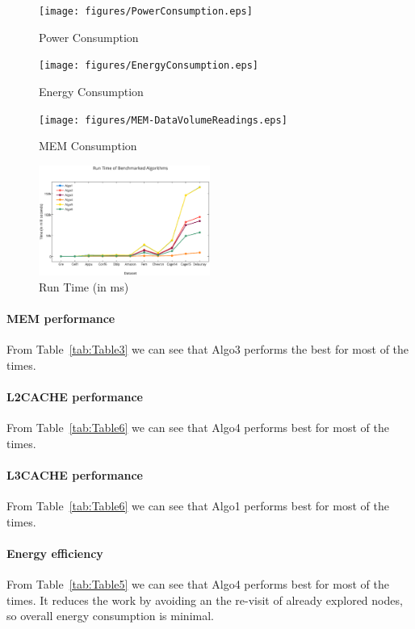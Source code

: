 \begin{figure}[t]
    \centering
    \texttt{[image: figures/PowerConsumption.eps]}
    \caption{Power Consumption}
    \label{fig:Power Consumption}
\end{figure}


\begin{figure}[t]
    \centering
    \texttt{[image: figures/EnergyConsumption.eps]}
    \caption{Energy Consumption}
    \label{fig:Energy Consumption}
\end{figure}


\begin{figure}[t]
    \centering
    \texttt{[image: figures/MEM-DataVolumeReadings.eps]}
    \caption{MEM Consumption}
    \label{fig:MEM Consumption}
\end{figure}

\begin{figure}[t]
    \centering
    \includegraphics[width=0.5\textwidth]{figures/RunTimeofBenchmarkedAlgorithms.eps}
    \caption{Run Time (in ms)}
    \label{fig:Run Time}
\end{figure}

\paragraph{MEM performance}
From Table~\ref{tab:Table3} we can see that Algo3 performs the best
for most of the times.

\paragraph{L2CACHE performance}
From Table~\ref{tab:Table6} we can see that Algo4 performs best for
most of the times.

\paragraph{L3CACHE performance}
From Table~\ref{tab:Table6} we can see that Algo1 performs best for
most of the times.

\paragraph{Energy efficiency}
From Table~\ref{tab:Table5} we can see that Algo4 performs best for
most of the times. It reduces the work by avoiding an the re-visit of
already explored nodes, so overall energy consumption is minimal.

